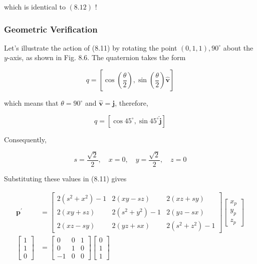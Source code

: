 \documentclass[10pt]{article}
\begin{document}
which is identical to $(8.12)$ !

\subsubsection{Geometric Verification}
Let's illustrate the action of (8.11) by rotating the point $(0,1,1), 90^{\circ}$ about the $y$-axis, as shown in Fig. 8.6. The quaternion takes the form

$$
q=\left[\cos \left(\frac{\theta}{2}\right), \sin \left(\frac{\theta}{2}\right) \hat{\mathbf{v}}\right]
$$

which means that $\theta=90^{\circ}$ and $\hat{\mathbf{v}}=\mathbf{j}$, therefore,

$$
q=\left[\cos 45^{\circ}, \sin 45^{\circ} \hat{\mathbf{j}}\right]
$$

Consequently,

$$
s=\frac{\sqrt{2}}{2}, \quad x=0, \quad y=\frac{\sqrt{2}}{2}, \quad z=0
$$

Substituting these values in (8.11) gives

$$
\begin{aligned}
\mathbf{p}^{\prime} & =\left[\begin{array}{ccc}
2\left(s^{2}+x^{2}\right)-1 & 2(x y-s z) & 2(x z+s y) \\
2(x y+s z) & 2\left(s^{2}+y^{2}\right)-1 & 2(y z-s x) \\
2(x z-s y) & 2(y z+s x) & 2\left(s^{2}+z^{2}\right)-1
\end{array}\right]\left[\begin{array}{l}
x_{p} \\
y_{p} \\
z_{p}
\end{array}\right] \\
{\left[\begin{array}{l}
1 \\
1 \\
0
\end{array}\right] } & =\left[\begin{array}{ccc}
0 & 0 & 1 \\
0 & 1 & 0 \\
-1 & 0 & 0
\end{array}\right]\left[\begin{array}{l}
0 \\
1 \\
1
\end{array}\right]
\end{aligned}
$$
\end{document}
